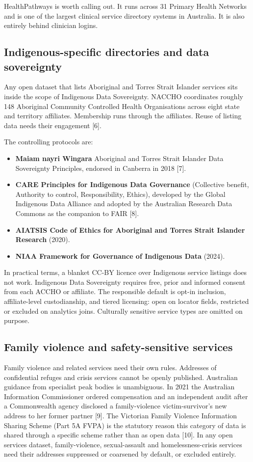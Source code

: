 \documentclass[11pt,a4paper]{article}
\begin{document}
HealthPathways is worth calling out. It runs across 31 Primary Health Networks and is one of the largest clinical service directory systems in Australia. It is also entirely behind clinician logins.

\subsection{Indigenous-specific directories and data sovereignty}

Any open dataset that lists Aboriginal and Torres Strait Islander services sits inside the scope of Indigenous Data Sovereignty. NACCHO coordinates roughly 148 Aboriginal Community Controlled Health Organisations across eight state and territory affiliates. Membership runs through the affiliates. Reuse of listing data needs their engagement [6].

The controlling protocols are:

\begin{itemize}[nosep]
    \item \textbf{Maiam nayri Wingara} Aboriginal and Torres Strait Islander Data Sovereignty Principles, endorsed in Canberra in 2018 [7].
    \item \textbf{CARE Principles for Indigenous Data Governance} (Collective benefit, Authority to control, Responsibility, Ethics), developed by the Global Indigenous Data Alliance and adopted by the Australian Research Data Commons as the companion to FAIR [8].
    \item \textbf{AIATSIS Code of Ethics for Aboriginal and Torres Strait Islander Research} (2020).
    \item \textbf{NIAA Framework for Governance of Indigenous Data} (2024).
\end{itemize}

In practical terms, a blanket CC-BY licence over Indigenous service listings does not work. Indigenous Data Sovereignty requires free, prior and informed consent from each ACCHO or affiliate. The responsible default is opt-in inclusion, affiliate-level custodianship, and tiered licensing: open on locator fields, restricted or excluded on analytics joins. Culturally sensitive service types are omitted on purpose.

\subsection{Family violence and safety-sensitive services}

Family violence and related services need their own rules. Addresses of confidential refuges and crisis services cannot be openly published. Australian guidance from specialist peak bodies is unambiguous. In 2021 the Australian Information Commissioner ordered compensation and an independent audit after a Commonwealth agency disclosed a family-violence victim-survivor's new address to her former partner [9]. The Victorian Family Violence Information Sharing Scheme (Part 5A FVPA) is the statutory reason this category of data is shared through a specific scheme rather than as open data [10]. In any open services dataset, family-violence, sexual-assault and homelessness-crisis services need their addresses suppressed or coarsened by default, or excluded entirely.
\end{document}
